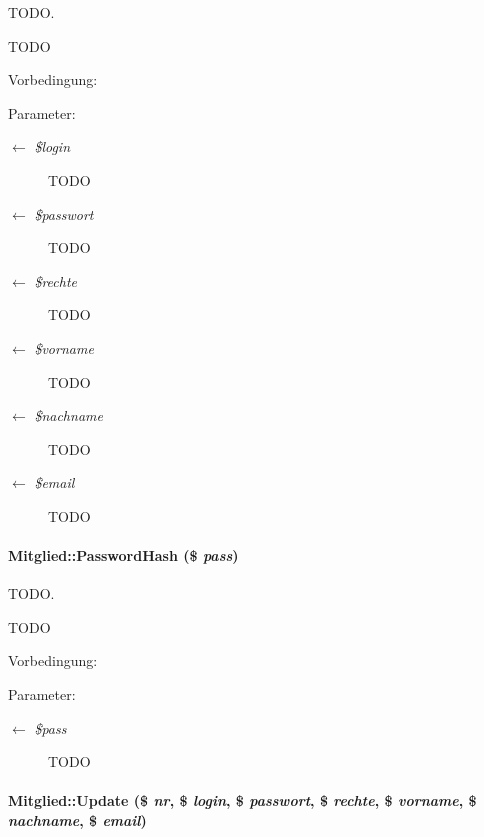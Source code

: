 TODO. 

TODO \begin{Desc}
\item[Vorbedingung:]\end{Desc}
\begin{Desc}
\item[Parameter:]
\begin{description}
\item[\mbox{$\leftarrow$} {\em \$login}]TODO \item[\mbox{$\leftarrow$} {\em \$passwort}]TODO \item[\mbox{$\leftarrow$} {\em \$rechte}]TODO \item[\mbox{$\leftarrow$} {\em \$vorname}]TODO \item[\mbox{$\leftarrow$} {\em \$nachname}]TODO \item[\mbox{$\leftarrow$} {\em \$email}]TODO \end{description}
\end{Desc}
\hypertarget{classMitglied_9b13db80866c22bf992e73f2eb75e369}{
\paragraph[PasswordHash]{\setlength{\rightskip}{0pt plus 5cm}Mitglied::Password\-Hash (\$ {\em pass})}\hfill}
\label{classMitglied_9b13db80866c22bf992e73f2eb75e369}


TODO. 

TODO \begin{Desc}
\item[Vorbedingung:]\end{Desc}
\begin{Desc}
\item[Parameter:]
\begin{description}
\item[\mbox{$\leftarrow$} {\em \$pass}]TODO \end{description}
\end{Desc}
\hypertarget{classMitglied_0d173487bebdd0579a70ea007b37b5ec}{
\paragraph[Update]{\setlength{\rightskip}{0pt plus 5cm}Mitglied::Update (\$ {\em nr}, \$ {\em login}, \$ {\em passwort}, \$ {\em rechte}, \$ {\em vorname}, \$ {\em nachname}, \$ {\em email})}\hfill}
\label{classMitglied_0d173487bebdd0579a70ea007b37b5ec}



